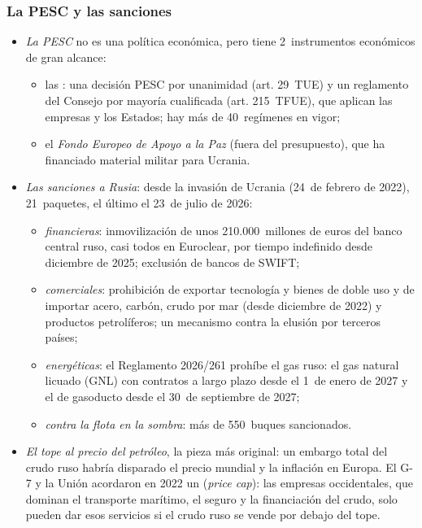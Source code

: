\documentclass[11pt]{article}
\begin{document}
\subsubsection{La PESC y las sanciones}\label{sec:sanciones}

\begin{itemize}
\item \emph{La PESC} no es una política económica, pero tiene 2~instrumentos económicos de gran alcance:
  \begin{itemize}
  \item las : una decisión PESC por unanimidad (art. 29~TUE) y un reglamento del Consejo por mayoría cualificada (art. 215~TFUE), que aplican las empresas y los Estados; hay más de 40~regímenes en vigor;
  \item el \emph{Fondo Europeo de Apoyo a la Paz} (fuera del presupuesto), que ha financiado material militar para Ucrania.
  \end{itemize}
\item \emph{Las sanciones a Rusia}: desde la invasión de Ucrania (24~de febrero de 2022), 21~paquetes, el último el 23~de julio de 2026\nocite{CE2026Paquete21}:
  \begin{itemize}
  \item \emph{financieras}: inmovilización de unos 210.000~millones de euros del banco central ruso, casi todos en Euroclear, por tiempo indefinido desde diciembre de 2025; exclusión de bancos de SWIFT;
  \item \emph{comerciales}: prohibición de exportar tecnología y bienes de doble uso y de importar acero, carbón, crudo por mar (desde diciembre de 2022) y productos petrolíferos; un mecanismo contra la elusión por terceros países;
  \item \emph{energéticas}: el Reglamento 2026/261 prohíbe el gas ruso: el gas natural licuado (GNL) con contratos a largo plazo desde el 1~de enero de 2027 y el de gasoducto desde el 30~de septiembre de 2027\nocite{UE2026GasRuso};
  \item \emph{contra la flota en la sombra}: más de 550~buques sancionados.
  \end{itemize}
\item \emph{El tope al precio del petróleo}, la pieza más original: un embargo total del crudo ruso habría disparado el precio mundial y la inflación en Europa. El G-7 y la Unión acordaron en 2022 un  (\emph{price cap}): las empresas occidentales, que dominan el transporte marítimo, el seguro y la financiación del crudo, solo pueden dar esos servicios si el crudo ruso se vende por debajo del tope\nocite{JohnsonRachelWolfram2023}.

\end{itemize}
\end{document}
